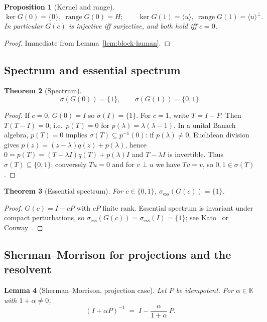 \documentclass[11pt]{article}
\newtheorem{theorem}{Theorem}[section]
\newtheorem{proposition}[theorem]{Proposition}
\newtheorem{lemma}[theorem]{Lemma}
\theoremstyle{definition}
\newcommand{\K}{\mathbb{K}}
\DeclareMathOperator{\range}{range}
\DeclareMathOperator{\kerop}{ker}
\begin{document}
\begin{proposition}[Kernel and range]\label{prop:ker-range-human}
\[
\kerop G(0)=\{0\},\ \range G(0)=H;\qquad
\kerop G(1)=\langle u\rangle,\ \range G(1)=\langle u\rangle^\perp.
\]
In particular $G(c)$ is injective iff surjective, and both hold iff $c=0$.
\end{proposition}

\begin{proof}
Immediate from Lemma~\ref{lem:block-human}.
\end{proof}

\subsection{Spectrum and essential spectrum}

\begin{theorem}[Spectrum]\label{thm:spectrum-human}
\[
\sigma(G(0))=\{1\},\qquad \sigma(G(1))=\{0,1\}.
\]
\end{theorem}

\begin{proof}
If $c=0$, $G(0)=I$ so $\sigma(I)=\{1\}$. For $c=1$, write $T=I-P$. Then
$T(T-I)=0$, i.e.\ $p(T)=0$ for $p(\lambda)=\lambda(\lambda-1)$. In a unital Banach algebra, $p(T)=0$ implies $\sigma(T)\subseteq p^{-1}(0)$: if $p(\lambda)\ne 0$, Euclidean division gives $p(z)=(z-\lambda)q(z)+p(\lambda)$, hence $0=p(T)=(T-\lambda I)q(T)+p(\lambda)I$ and $T-\lambda I$ is invertible. Thus $\sigma(T)\subseteq\{0,1\}$; conversely $Tu=0$ and for $v\perp u$ we have $Tv=v$, so $0,1\in\sigma(T)$.
\end{proof}

\begin{theorem}[Essential spectrum]\label{thm:ess-human}
For $c\in\{0,1\}$, $\sigma_{\mathrm{ess}}(G(c))=\{1\}$.
\end{theorem}

\begin{proof}
$G(c)=I-cP$ with $cP$ finite rank. Essential spectrum is invariant under compact perturbations, so $\sigma_{\mathrm{ess}}(G(c))=\sigma_{\mathrm{ess}}(I)=\{1\}$; see Kato~\cite{Kato} or Conway~\cite{Conway}.
\end{proof}

\subsection{Sherman--Morrison for projections and the resolvent}

\begin{lemma}[Sherman--Morrison, projection case]\label{lem:SM-human}
Let $P$ be idempotent. For $\alpha\in\K$ with $1+\alpha\neq 0$,
\[
(I+\alpha P)^{-1} \;=\; I - \frac{\alpha}{1+\alpha}\,P.
\]
\end{lemma}
\end{document}
